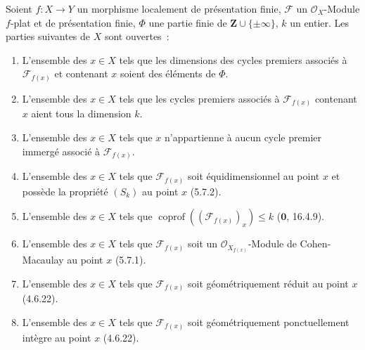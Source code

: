 \begin{theorem}[12.1.1]
Soient $f:X\to Y$ un morphisme localement de présentation finie, $\mathcal F$
un $\mathcal O_X$-Module $f$-plat et de présentation finie, $\Phi$ une partie
finie de $\mathbf Z\cup\{\pm\infty\}$, $k$ un entier. Les parties suivantes de
$X$ sont ouvertes~:
\begin{enumerate}[label=(\roman*)]
  \item L'ensemble des $x\in X$ tels que les dimensions des cycles premiers
  associés à $\mathcal F_{f(x)}$ et contenant $x$ soient des éléments de
  $\Phi$.
  \item L'ensemble des $x\in X$ tels que les cycles premiers associés à
  $\mathcal F_{f(x)}$ contenant $x$ aient tous la dimension $k$.
  \item L'ensemble des $x\in X$ tels que $x$ n'appartienne à aucun cycle
  premier immergé associé à $\mathcal F_{f(x)}$.
  \item L'ensemble des $x\in X$ tels que $\mathcal F_{f(x)}$ soit
  équidimensionnel au point $x$ et possède la propriété $(S_k)$ au point $x$
  (5.7.2).
  \item L'ensemble des $x\in X$ tels que
  $\operatorname{coprof}((\mathcal F_{f(x)})_x)\leq k$
  ($\mathbf 0$, 16.4.9).
  \item L'ensemble des $x\in X$ tels que $\mathcal F_{f(x)}$ soit un
  $\mathcal O_{X_{f(x)}}$-Module de Cohen-Macaulay au point $x$ (5.7.1).
  \item L'ensemble des $x\in X$ tels que $\mathcal F_{f(x)}$ soit
  géométriquement réduit au point $x$ (4.6.22).
  \item L'ensemble des $x\in X$ tels que $\mathcal F_{f(x)}$ soit
  géométriquement ponctuellement intègre au point $x$ (4.6.22).
\end{enumerate}
\end{theorem}

